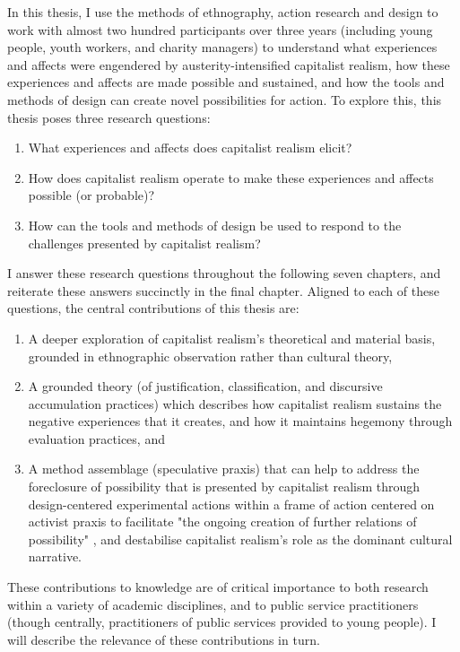 In this thesis, I use the methods of ethnography, action research and design to work with almost two hundred participants over three years (including young people, youth workers, and charity managers) to understand what experiences and affects were engendered by austerity-intensified capitalist realism, how these experiences and affects are made possible and sustained, and how the tools and methods of design can create novel possibilities for action. To explore this, this thesis poses three research questions: 
\begin{enumerate}
    \item What experiences and affects does capitalist realism elicit?
    \item How does capitalist realism operate to make these experiences and affects possible (or probable)?
    \item How can the tools and methods of design be used to respond to the challenges presented by capitalist realism?
\end{enumerate}
I answer these research questions throughout the following seven chapters, and reiterate these answers succinctly in the final chapter. Aligned to each of these questions, the central contributions of this thesis are:
\begin{enumerate}
    \item A deeper exploration of capitalist realism's theoretical and material basis, grounded in ethnographic observation rather than cultural theory,
    \item A grounded theory (of justification, classification, and discursive accumulation practices) which describes how capitalist realism sustains the negative experiences that it creates, and how it maintains hegemony through evaluation practices, and
    \item A method assemblage (speculative praxis) that can help to address the foreclosure of possibility that is presented by capitalist realism through design-centered experimental actions within a frame of action centered on activist praxis to facilitate "the ongoing creation of further relations of possibility" \citep[p. 320]{harrison_future_2020}, and destabilise capitalist realism's role as the dominant cultural narrative. 
\end{enumerate}
These contributions to knowledge are of critical importance to both research within a variety of academic disciplines, and to public service practitioners (though centrally, practitioners of public services provided to young people). I will describe the relevance of these contributions in turn. 

